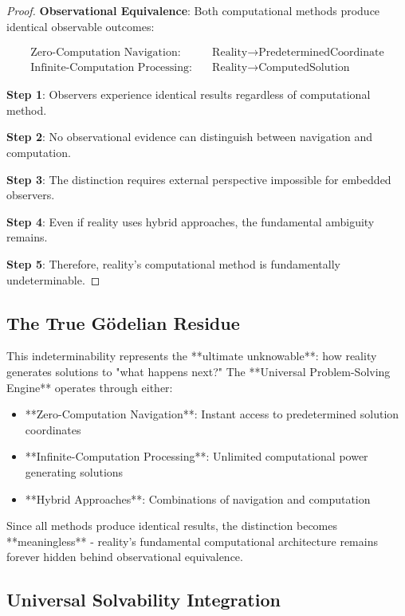\documentclass[12pt,a4paper]{article}
\begin{document}
\begin{proof}
\textbf{Observational Equivalence}: Both computational methods produce identical observable outcomes:

\begin{align}
\text{Zero-Computation Navigation:} \quad &\text{Reality} \to \text{PredeterminedCoordinate} \\
\text{Infinite-Computation Processing:} \quad &\text{Reality} \to \text{ComputedSolution}
\end{align}

\textbf{Step 1}: Observers experience identical results regardless of computational method.

\textbf{Step 2}: No observational evidence can distinguish between navigation and computation.

\textbf{Step 3}: The distinction requires external perspective impossible for embedded observers.

\textbf{Step 4}: Even if reality uses hybrid approaches, the fundamental ambiguity remains.

\textbf{Step 5}: Therefore, reality's computational method is fundamentally undeterminable.
\end{proof}

\subsection{The True Gödelian Residue}

This indeterminability represents the **ultimate unknowable**: how reality generates solutions to "what happens next?" The **Universal Problem-Solving Engine** operates through either:

\begin{itemize}
\item **Zero-Computation Navigation**: Instant access to predetermined solution coordinates
\item **Infinite-Computation Processing**: Unlimited computational power generating solutions
\item **Hybrid Approaches**: Combinations of navigation and computation
\end{itemize}

Since all methods produce identical results, the distinction becomes **meaningless** - reality's fundamental computational architecture remains forever hidden behind observational equivalence.

\subsection{Universal Solvability Integration}
\end{document}
